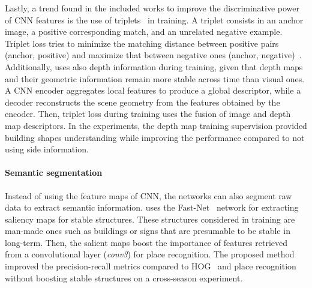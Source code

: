 Lastly, a trend found in the included works to improve the discriminative power of CNN features is the use of triplets~\parencite{martini-et-al:2020:s20216002,liu-et-al:2021:9561126,piasco-et-al:2021:6,sun-et-al:2021:9635886,yin-et-al:2021:3061375,yin-et-al:2021:661199} in training.
A triplet consists in an anchor image, a positive corresponding match, and an unrelated negative example. Triplet loss tries to minimize the matching distance between positive pairs (anchor, positive) and maximize that between negative ones (anchor, negative)~\parencite{sun-et-al:2021:9635886}.
Additionally, \cite{piasco-et-al:2021:6} uses also depth information during training, given that depth maps and their geometric information remain more stable across time than visual ones. A CNN encoder aggregates local features to produce a global descriptor, while a decoder reconstructs the scene geometry from the features obtained by the encoder. Then, triplet loss during training uses the fusion of image and depth map descriptors. In the experiments, the depth map training supervision provided building shapes understanding while improving the performance compared to not using side information.


\paragraph{Semantic segmentation}

Instead of using the feature maps of CNN, the networks can also segment raw data to extract semantic information.
\cite{naseer-et-al:2017:7989305} uses the Fast-Net~\parencite{original:fast-net} network for extracting saliency maps for stable structures. These structures considered in training are man-made ones such as buildings or signs that are presumable to be stable in long-term. Then, the salient maps boost the importance of features retrieved from a convolutional layer (\textit{conv3}) for place recognition. The proposed method improved the precision-recall metrics compared to HOG~\parencite{original:hog} and place recognition without boosting stable structures on a cross-season experiment.

